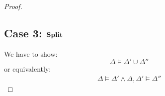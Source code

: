 \begin{mytheorem}
\begin{proof}
\subsection*{Case 3: $\mathbf{Split}$}


We have to show: $$ \Delta \models \Delta' \cup \Delta'' $$ or equivalently:
\begin{align*}
\Delta \models \Delta'  \wedge \Delta,\Delta' \models \Delta''
\end{align*}

%
%
%

\end{proof}
\end{mytheorem}
